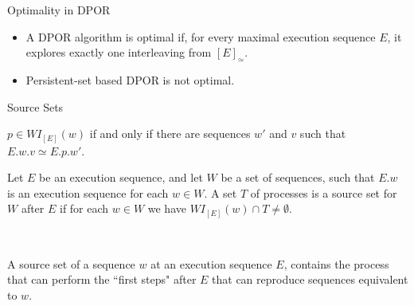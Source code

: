 \begin{frame} {Optimality in DPOR}

\begin{itemize}[<+->]
\item A DPOR algorithm is optimal if, for every maximal execution sequence $E$, it explores exactly one interleaving from 
$[E]_{\simeq}$.
\item Persistent-set based DPOR is not optimal.
\end{itemize}
\end{frame}


\begin{frame}{Source Sets}



\begin{definition}

$p \in WI_{[E]}(w)$ if and only if there are sequences $w'$ and $v$ such
that $E.w.v \simeq E.p.w'$.

\end{definition}

\begin{definition}
Let $E$ be an execution sequence,
and let $W$ be a set of sequences, such that $E.w$ is an execution
sequence for each $w \in W$. A set $T$ of processes is a source set for
$W$ after $E$ if for each $w \in W$ we have $WI_{[E]}(w) \cap T  \neq \emptyset$.
\end{definition}
\\

\item A source set of a sequence $w$ at an execution sequence $E$, contains the process that can perform the  ``first steps" 
after $E$ that can reproduce sequences equivalent to $w$.

\end{frame}


